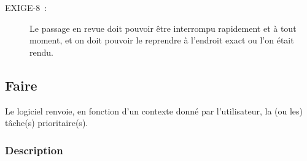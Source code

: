 \begin{description}
 \item[EXIGE-8~:] Le passage en revue doit pouvoir être interrompu rapidement et à tout moment, et on doit pouvoir le reprendre à l'endroit exact ou l'on était rendu.
 \end{description}

	\subsection{Faire}

Le logiciel renvoie, en fonction d'un contexte donné par l'utilisateur, la (ou les) tâche(s) prioritaire(s).

\subsubsection{Description}

